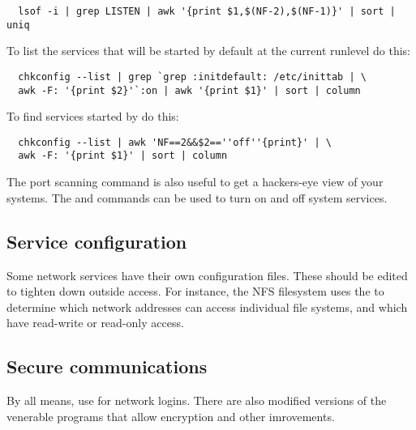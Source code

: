 \begin{verbatim}
  lsof -i | grep LISTEN | awk '{print $1,$(NF-2),$(NF-1)}' | sort | uniq
\end{verbatim}

\noindent To list the services that will be started by default at the
current runlevel do this:

\begin{verbatim}
  chkconfig --list | grep `grep :initdefault: /etc/inittab | \
  awk -F: '{print $2}'`:on | awk '{print $1}' | sort | column
\end{verbatim}

\noindent To find services started by  do this:

\begin{verbatim}
  chkconfig --list | awk 'NF==2&&$2==''off''{print}' | \
  awk -F: '{print $1}' | sort | column
\end{verbatim}

The  port scanning command is also useful to get a
hackers-eye view of your systems.  The  and
\cmd{service} commands can be used to turn on and off system services.

\subsection{Service configuration}

Some network services have their own configuration files. These should be 
edited to tighten down outside access.  For instance, the NFS filesystem
uses the \file{/etc/exports} to determine which network addresses can access
individual file systems, and which have read-write or read-only access.

\subsection{Secure communications}

By all means, use  for network logins.  There are also
modified versions of the venerable  programs that allow
encryption and other imrovements.

